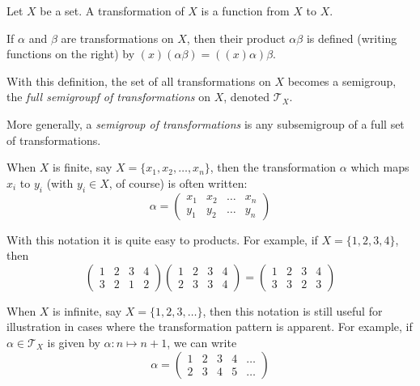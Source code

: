 \documentclass[12pt]{article}
\begin{document}
Let $X$ be a set.  A transformation of $X$ is a function from $X$ to $X$.

If $\alpha$ and $\beta$ are transformations on $X$, then their product $\alpha \beta$ is defined (writing functions on the right) by $(x)(\alpha \beta) = ((x) \alpha)\beta$.

With this definition, the set of all transformations on $X$ becomes a semigroup, the \emph{full semigroupf of transformations} on $X$, denoted $\mathcal{T}_X$.

More generally, a \emph{semigroup of transformations} is any subsemigroup of a full set of transformations.

When $X$ is finite, say $X = \{x_1, x_2, \dots, x_n\}$, then the transformation $\alpha$ which maps $x_i$ to $y_i$ (with $y_i \in X$, of course) is often written:
$$
\alpha = 
\begin{pmatrix}
x_1 & x_2 & \dots & x_n \\
y_1 & y_2 & \dots & y_n 
\end{pmatrix}
$$

With this notation it is quite easy to  products.  For example, if $X = \{1, 2, 3, 4\}$, then
$$
\begin{pmatrix}
1 & 2 & 3 & 4 \\
3 & 2 & 1 & 2 
\end{pmatrix}
\begin{pmatrix}
1 & 2 & 3 & 4 \\
2 & 3 & 3 & 4 
\end{pmatrix}
=
\begin{pmatrix}
1 & 2 & 3 & 4 \\
3 & 3 & 2 & 3 
\end{pmatrix}
$$

When $X$ is infinite, say $X = \{1, 2, 3, \dotsc \}$, then this notation is still useful for illustration in cases where the transformation pattern is apparent.  For example, if $\alpha \in \mathcal{T}_X$ is given by $\alpha \colon n \mapsto n+1$, we can write
$$
\alpha = 
\begin{pmatrix}
1 & 2 & 3 & 4 & \dots \\
2 & 3 & 4 & 5 & \dots 
\end{pmatrix}
$$
\end{document}
